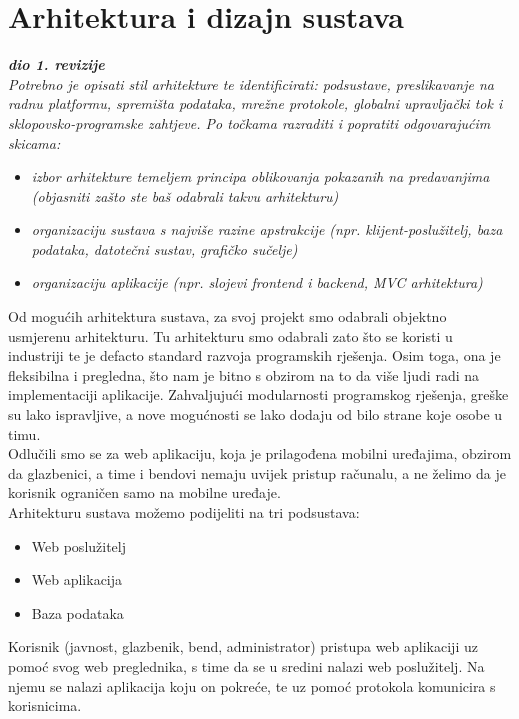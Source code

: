 \chapter{Arhitektura i dizajn sustava}
		
		\textbf{\textit{dio 1. revizije}}\\

		\textit{ Potrebno je opisati stil arhitekture te identificirati: podsustave, preslikavanje na radnu platformu, spremišta podataka, mrežne protokole, globalni upravljački tok i sklopovsko-programske zahtjeve. Po točkama razraditi i popratiti odgovarajućim skicama:}
	\begin{itemize}
		\item 	\textit{izbor arhitekture temeljem principa oblikovanja pokazanih na predavanjima (objasniti zašto ste baš odabrali takvu arhitekturu)}
		\item 	\textit{organizaciju sustava s najviše razine apstrakcije (npr. klijent-poslužitelj, baza podataka, datotečni sustav, grafičko sučelje)}
		\item 	\textit{organizaciju aplikacije (npr. slojevi frontend i backend, MVC arhitektura) }		
	\end{itemize}
	
	Od mogućih arhitektura sustava, za svoj projekt smo odabrali objektno usmjerenu arhitekturu. Tu arhitekturu smo odabrali zato što se koristi u industriji te je defacto standard razvoja programskih rješenja. Osim toga, ona je fleksibilna i pregledna, što nam je bitno s obzirom na to da više ljudi radi na implementaciji aplikacije. Zahvaljujući modularnosti programskog rješenja, greške su lako ispravljive, a nove mogućnosti se lako dodaju od bilo strane koje osobe u timu.\\

	Odlučili smo se za web aplikaciju, koja je prilagođena mobilni uređajima, obzirom da glazbenici, a time i bendovi nemaju uvijek pristup računalu, a ne želimo da je korisnik ograničen samo na mobilne uređaje.\\

	Arhitekturu sustava možemo podijeliti na tri podsustava:
		\begin{itemize}
			\item Web poslužitelj
    			\item Web aplikacija
			\item Baza podataka
		\end{itemize}


	Korisnik (javnost, glazbenik, bend, administrator) pristupa web aplikaciji uz pomoć svog web preglednika, s time da se u sredini nalazi web poslužitelj. Na njemu se nalazi aplikacija koju on pokreće, te uz pomoć protokola komunicira s korisnicima.\\

